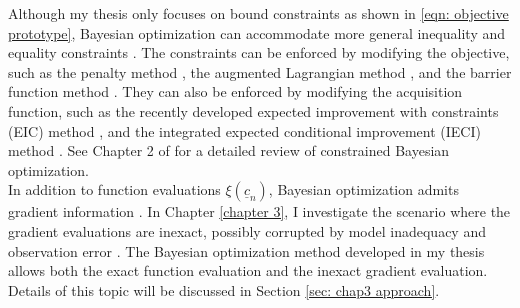 Although my thesis only focuses on bound constraints as shown in \eqref{eqn: objective prototype}, 
Bayesian optimization can accommodate more general inequality and equality 
constraints \cite{PhD review constraint}. The constraints can be enforced by modifying the objective, such as
the penalty method \cite{penalty method}, the augmented Lagrangian method
\cite{augmented lagrangian method}, and the barrier function method \cite{barrier method}.
They can also be enforced by modifying the acquisition function, such as the
recently developed expected improvement with constraints (EIC) method \cite{EIC},
and the integrated expected conditional improvement (IECI) method \cite{IECI}.
See Chapter 2 of \cite{PhD review constraint} 
for a detailed review of constrained Bayesian optimization.\\

In addition to function evaluations $\xi(\underline{c}_n)$, Bayesian optimization
admits gradient information \cite{derivative RKHS, grad coKriging}. In Chapter \ref{chapter 3},
I investigate the scenario where the gradient
evaluations are inexact, possibly corrupted by model inadequacy and observation error
\cite{KennedyOhagan2}.
The Bayesian optimization method developed in my thesis 
allows both the exact function evaluation and the inexact gradient evaluation.
Details of this topic will be discussed in Section
\ref{sec: chap3 approach}.


